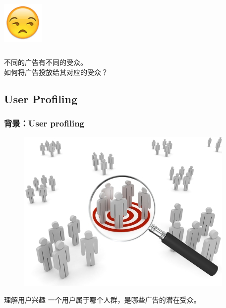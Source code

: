 \documentclass{beamer}
\begin{document}
\begin{frame}
\begin{columns}[T]
\begin{column}{.5\textwidth}
\begin{center}
        \includegraphics[width=0.15\textwidth]{img/emoji_unamused.png}
      \end{center}
    \end{column}
  \end{columns}

  \pause

  \begin{block}{}
   不同的广告有不同的受众。\\
   如何将广告投放给其对应的受众？
  \end{block}

\end{frame}

\subsection{User Profiling}

\begin{frame}
\frametitle{背景：User profiling}
\begin{figure}
\includegraphics[width=.6\linewidth]{img/target_market.png}
\end{figure}
\begin{block}{理解用户兴趣}
一个用户属于哪个人群，是哪些广告的潜在受众。
\end{block}
\end{frame}
\end{document}

